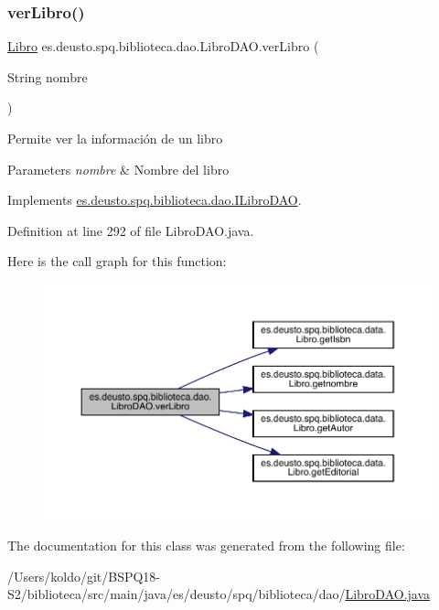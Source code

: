 \subsubsection{\texorpdfstring{ver\+Libro()}{verLibro()}}
{\footnotesize\ttfamily \mbox{\hyperlink{classes_1_1deusto_1_1spq_1_1biblioteca_1_1data_1_1_libro}{Libro}} es.\+deusto.\+spq.\+biblioteca.\+dao.\+Libro\+D\+A\+O.\+ver\+Libro (\begin{DoxyParamCaption}\item[{String}]{nombre }\end{DoxyParamCaption})}

Permite ver la información de un libro 
\begin{DoxyParams}{Parameters}
{\em nombre} & Nombre del libro \\
\hline
\end{DoxyParams}


Implements \mbox{\hyperlink{interfacees_1_1deusto_1_1spq_1_1biblioteca_1_1dao_1_1_i_libro_d_a_o_ae390d687e8e4ec02a401291da5076062}{es.\+deusto.\+spq.\+biblioteca.\+dao.\+I\+Libro\+D\+AO}}.



Definition at line 292 of file Libro\+D\+A\+O.\+java.

Here is the call graph for this function\+:
\nopagebreak
\begin{figure}[H]
\begin{center}
\leavevmode
\includegraphics[width=350pt]{classes_1_1deusto_1_1spq_1_1biblioteca_1_1dao_1_1_libro_d_a_o_a8138eaa485efda1fa97a158f460301dd_cgraph}
\end{center}
\end{figure}


The documentation for this class was generated from the following file\+:\begin{DoxyCompactItemize}
\item 
/\+Users/koldo/git/\+B\+S\+P\+Q18-\/\+S2/biblioteca/src/main/java/es/deusto/spq/biblioteca/dao/\mbox{\hyperlink{_libro_d_a_o_8java}{Libro\+D\+A\+O.\+java}}\end{DoxyCompactItemize}
